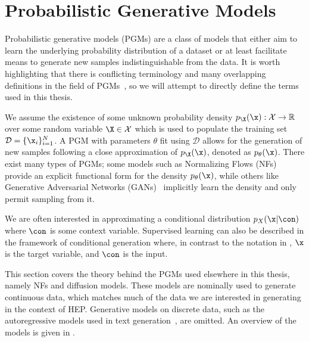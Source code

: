 \chapter{Probabilistic Generative Models}
\label{ch:generative_models}

Probabilistic generative models (PGMs) are a class of models that either aim to learn the underlying probability distribution of a dataset or at least facilitate means to generate new samples indistinguishable from the data.
It is worth highlighting that there is conflicting terminology and many overlapping definitions in the field of PGMs~\cite{DiscriminativeVsGenerative, MachineLearningDiscriminative}, so we will attempt to directly define the terms used in this thesis.

We assume the existence of some unknown probability density $p_\X(\x): \mathcal{X} \rightarrow \mathbb{R}$ over some random variable $\X \in \mathcal{X}$ which is used to populate the training set $\mathcal{D} = \{\x_i\}_{i=1}^N$.
A PGM with parameters $\theta$ fit using $\mathcal{D}$ allows for the generation of new samples following a close approximation of $p_\X(\x)$, denoted as $p_{\theta}(\x)$.
There exist many types of PGMs; some models such as Normalizing Flows (NFs)~\cite{VariationalInferenceNormalizing} provide an explicit functional form for the density $p_{\theta}(\x)$, while others like Generative Adversarial Networks (GANs)~\cite{GenerativeAdversarialNetworks} implicitly learn the density and only permit sampling from it.

We are often interested in approximating a conditional distribution $p_{X}(\x|\con)$ where $\con$ is some context variable.
Supervised learning can also be described in the framework of conditional generation where, in contrast to the notation in , $\x$ is the target variable, and $\con$ is the input.

This section covers the theory behind the PGMs used elsewhere in this thesis, namely NFs and diffusion models.
These models are nominally used to generate continuous data, which matches much of the data we are interested in generating in the context of HEP.
Generative models on discrete data, such as the autoregressive models used in text generation~\cite{GPT2}, are omitted.
An overview of the models is given in .

